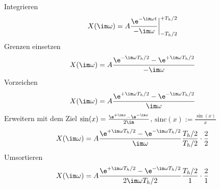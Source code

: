 \begin{ExCalc}
Integrieren
\begin{equation}
X(\im \omega) = A \frac{\e^{-\im \omega t}}{-\im \omega} \bigg|_{-T_h/2}^{+T_h/2}
\end{equation}
Grenzen einsetzen
\begin{equation}
X(\im \omega) = A \frac{\e^{-\im \omega T_h/2}-\e^{+\im \omega T_h/2}}{-\im \omega}
\end{equation}
Vorzeichen
\begin{equation}
X(\im \omega) = A \frac{\e^{+\im \omega T_h/2}-\e^{-\im \omega T_h/2}}{\im \omega}
\end{equation}
Erweitern mit dem Ziel $\sin(x) = \frac{\e^{+\im x}-\e^{-\im x}}{2\im}$, $\mathrm{sinc}(x):=\frac{\sin(x)}{x}$
\begin{equation}
X(\im \omega) = A \frac{\e^{+\im \omega T_h/2}-\e^{-\im \omega T_h/2}}{\im \omega} \frac{T_h/2}{T_h/2} \cdot \frac{2}{2}
\end{equation}
Umsortieren
\begin{equation}
X(\im \omega) = A \frac{\e^{+\im \omega T_h/2}-\e^{-\im \omega T_h/2}}{2 \im \omega T_h/2} \frac{T_h/2}{1} \cdot \frac{2}{1}
\end{equation}
\end{ExCalc}

